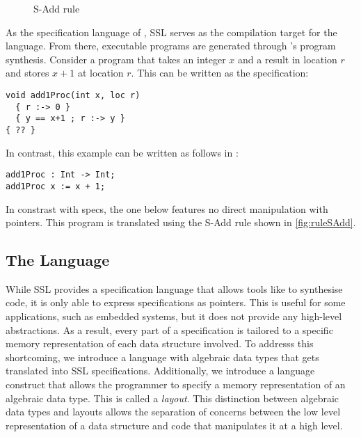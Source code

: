 \begin{figure}
  \caption{{\sc S-Add} rule}
  \label{fig:ruleSAdd}
\end{figure}

As the specification language of \SuSLik, SSL serves as the
compilation target for the \Pika{} language. From there, executable
programs are generated through \SuSLik's program synthesis. Consider a
program that takes an integer $x$ and a result in location $r$ and
stores $x+1$ at location $r$. This can be written as the \SuSLik{}
specification:

\begin{lstlisting}[language=SynLang]
void add1Proc(int x, loc r)
  { r :-> 0 }
  { y == x+1 ; r :-> y }
{ ?? }
\end{lstlisting}

\noindent
In contrast, this example can be written as follows in \Pika:

\begin{lstlisting}[language=Pika]
add1Proc : Int -> Int;
add1Proc x := x + 1;
\end{lstlisting}

\noindent
In constrast with \SuSLik{} specs, the one below features no direct
manipulation with pointers.
%
This program is translated using the {\sc S-Add} rule shown in
\autoref{fig:ruleSAdd}. 

\subsection{The \Pika{} Language}
\label{sec:language}

While SSL provides a specification language that allows tools like
\SuSLik{} to synthesise code, it is only able to express specifications
as pointers. This is useful for some applications, such as embedded
systems, but it does not provide any high-level abstractions. As a
result, every part of a specification is tailored to a specific memory
representation of each data structure involved.
%
To addresss this shortcoming, we introduce a language with algebraic
data types that gets translated into SSL specifications. Additionally,
we introduce a language construct that allows the programmer to
specify a memory representation of an algebraic data type. This is
called a \textit{layout}. This distinction between algebraic data
types and layouts allows the separation of concerns between the low
level representation of a data structure and code that manipulates it
at a high level.

